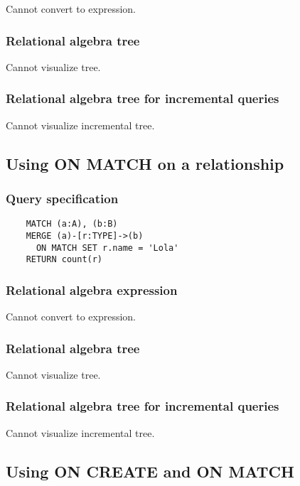 	Cannot convert to expression.

	\subsubsection*{Relational algebra tree}

	Cannot visualize tree.

	\subsubsection*{Relational algebra tree for incremental queries}

	Cannot visualize incremental tree.
	\subsection{Using ON MATCH on a relationship}

	\subsubsection*{Query specification}

	\begin{lstlisting}
	MATCH (a:A), (b:B)
	MERGE (a)-[r:TYPE]->(b)
	  ON MATCH SET r.name = 'Lola'
	RETURN count(r)
	\end{lstlisting}


	\subsubsection*{Relational algebra expression}

	Cannot convert to expression.

	\subsubsection*{Relational algebra tree}

	Cannot visualize tree.

	\subsubsection*{Relational algebra tree for incremental queries}

	Cannot visualize incremental tree.
	\subsection{Using ON CREATE and ON MATCH}

